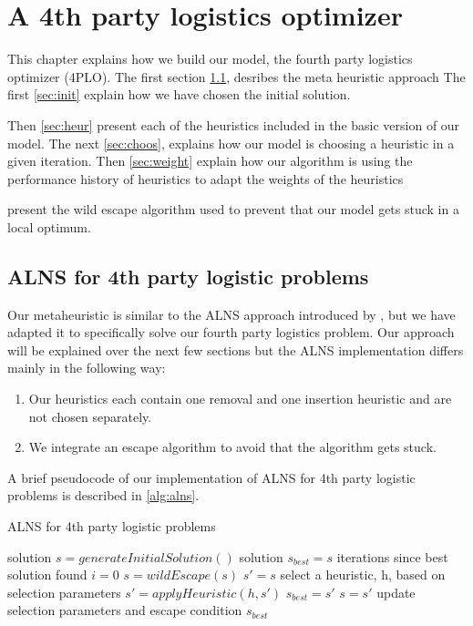 \documentclass[../main.tex]{subfiles}
\begin{document}
                                                
\chapter{A 4th party logistics optimizer}
\label{ch:appr}
This chapter explains how we build our model, the fourth party logistics optimizer (4PLO).
The first section \cref{sec:alns}, desribes the meta heuristic approach 
The first \cref{sec:init} explain how we have chosen the initial solution.\par
Then \cref{sec:heur} present each of the heuristics included in the basic version of our model.
The next \cref{sec:choos}, explains how our model is choosing a heuristic in a given iteration. 
Then \cref{sec:weight} explain how our algorithm is using the performance history of heuristics to adapt the weights of the heuristics 

 present the wild escape algorithm used to prevent that our model gets stuck in a local optimum.

\section{ALNS for 4th party logistic problems}
\label{sec:alns}
Our metaheuristic is similar to the ALNS approach introduced by \cite{ropke06}, but we have adapted it to specifically solve our fourth party logistics problem. 
Our approach will be explained over the next few sections but the ALNS implementation differs mainly in the following way:
\begin{enumerate}
    \item Our heuristics each contain one removal and one insertion heuristic and are not chosen separately. 
    \item We integrate an escape algorithm to avoid that the algorithm gets stuck.
\end{enumerate}

A brief pseudocode of our implementation of ALNS for 4th party logistic problems is described in \cref{alg:alns}.  

\begin{algorithm}
    \label{alg:alns}
    \caption{ALNS for 4th party logistic problems}
    \begin{algorithmic}[1]
        \State solution $s = generateInitialSolution()$
        \State solution $s_{best} = s$
        \State iterations since best solution found $i=0$
        \Repeat
                \State $s = wildEscape(s)$ 
            \EndIf
            \State $s' = s$
            \State select a heuristic, h, based on selection parameters
            \State $s' = applyHeuristic(h,s')$
                \State $s_{best}=s'$
            \EndIf
                \State $s = s'$
            \EndIf
            \State update selection parameters and escape condition
        \State
        \Return $s_{best}$
        \EndFunction
    \end{algorithmic}
\end{algorithm}
\end{document}
